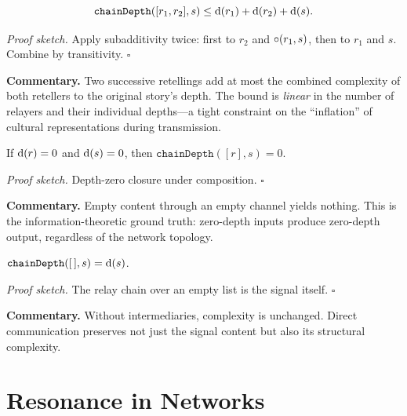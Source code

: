\begin{theorem}
\label{thm:two_relay_depth_bound}
\[
  \texttt{chainDepth}([r_1, r_2], s) \leq
  \operatorname{d}(r_1) + \operatorname{d}(r_2) + \operatorname{d}(s).
\]
\end{theorem}

\noindent\textit{Proof sketch.}\quad
Apply subadditivity twice: first to $r_2$ and $\circ(r_1, s)$, then to
$r_1$ and $s$.  Combine by transitivity.
\hfill$\square$

\medskip

\noindent\textbf{Commentary.}
Two successive retellings add at most the combined complexity of both
retellers to the original story's depth.  The bound is \emph{linear} in the
number of relayers and their individual depths---a tight constraint on the
``inflation'' of cultural representations during transmission.

\begin{theorem}
\label{thm:depth_zero_relay}
If $\operatorname{d}(r) = 0$ and $\operatorname{d}(s) = 0$, then $\texttt{chainDepth}([r], s) = 0$.
\end{theorem}

\noindent\textit{Proof sketch.}\quad
Depth-zero closure under composition.
\hfill$\square$

\medskip

\noindent\textbf{Commentary.}
Empty content through an empty channel yields nothing.  This is the
information-theoretic ground truth: zero-depth inputs produce zero-depth
output, regardless of the network topology.

\begin{theorem}
\label{thm:empty_chain_depth}
$\texttt{chainDepth}([\,], s) = \operatorname{d}(s)$.
\end{theorem}

\noindent\textit{Proof sketch.}\quad
The relay chain over an empty list is the signal itself.
\hfill$\square$

\medskip

\noindent\textbf{Commentary.}
Without intermediaries, complexity is unchanged.  Direct communication
preserves not just the signal content but also its structural complexity.

\section{Resonance in Networks}
\label{sec:ch18-resonance}

